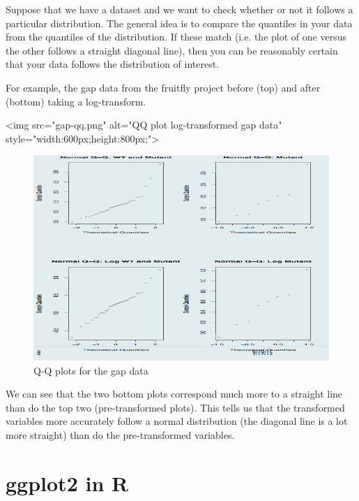 Suppose that we have a dataset and we want to check whether or not it follows a particular distribution. The general idea is to compare the quantiles in your data from the quantiles of the distribution. If these match (i.e. the plot of one versus the other follows a straight diagonal line), then you can be reasonably certain that your data follows the distribution of interest.

For example, the gap data from the fruitfly project before (top) and after (bottom) taking a log-transform.

<img src="gap-qq.png" alt="QQ plot log-transformed gap data" style="width:600px;height:800px;">

\begin{figure}[H]
\begin{center}
\includegraphics[scale=0.5]{gap-qq.png}
\end{center}
\caption{Q-Q plots for the gap data}
\label{fig:qq}
\end{figure}

We can see that the two bottom plots correspond much more to a straight line than do the top two (pre-transformed plots). This tells us that the transformed variables more accurately follow a normal distribution (the diagonal line is a lot more straight) than do the pre-transformed variables.





\section{ggplot2 in R}






